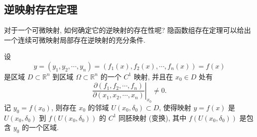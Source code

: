 \subsection{逆映射存在定理}
\label{subsec:ma-14-4-3}

对于一个可微映射, 如何确定它的逆映射的存在性呢? 隐函数组存在定理可以给出一个连续可微映射局部存在逆映射的充分条件.

\begin{theorem}[{逆映射存在定理}]\label{theorem:ma-14-4-4}
设
\[
  y=(y_1,y_2,\cdots,y_n)=(f_1(x),f_2(x),\cdots,f_n(x))=f(x)
\]
是区域 $D\subset\mathbb R^n$ 到区域 $\Omega\subset\mathbb R^n$ 的一个 $C^1$ 映射, 并且在 $x_0\in D$ 处有
\[
  \left.
  \frac{\partial(f_1,f_2,\cdots,f_n)}
       {\partial(x_1,x_2,\cdots,x_n)}
  \right|_{x_0}
  \ne0.
\]
记 $y_0=f(x_0)$, 则存在 $x_0$ 的邻域 $U(x_0,\delta_0)\subset D$, 使得映射 $y=f(x)$ 是 $U(x_0,\delta_0)$ 到 $f(U(x_0,\delta_0))$ 的 $C^1$ 同胚映射 (变换), 其中 $f(U(x_0,\delta_0))$ 是包含 $y_0$ 的一个区域.
\end{theorem}


